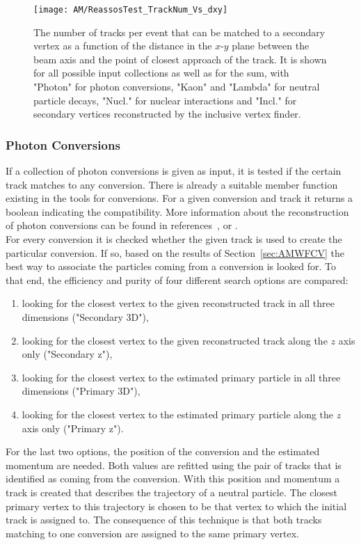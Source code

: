 \begin{figure}[Ht]
    \centering
    \texttt{[image: AM/ReassosTest\_TrackNum\_Vs\_dxy]}
    \caption[Number of tracks that can be matched to a secondary vertex]{The number of tracks per event that can be matched to a secondary vertex as a function of the distance in the $x$-$y$ plane between the beam axis and the point of closest approach of the track. It is shown for all possible input collections as well as for the sum, with "Photon" for photon conversions, "Kaon" and "Lambda" for neutral particle decays, "Nucl." for nuclear interactions and "Incl." for secondary vertices reconstructed by the inclusive vertex finder.\label{plot:AMWFSVfrac}}
\end{figure}

\subsubsection{Photon Conversions \label{sec:AMWFSVpc}}
If a collection of photon conversions is given as input, it is tested if the certain track matches to any conversion. There is already a suitable member function existing in the tools for conversions. For a given conversion and track it returns a boolean indicating the compatibility. More information about the reconstruction of photon conversions can be found in references~,  or . \\
For every conversion it is checked whether the given track is used to create the particular conversion. If so, based on the results of Section~\ref{sec:AMWFCV} the best way to associate the particles coming from a conversion is looked for. To that end, the efficiency and purity of four different search options are compared:
\begin{enumerate}
    \item looking for the closest vertex to the given reconstructed track in all three dimensions ("Secondary 3D"),
    \item looking for the closest vertex to the given reconstructed track along the $z$ axis only ("Secondary z"),
    \item looking for the closest vertex to the estimated primary particle in all three dimensions ("Primary 3D"),
    \item looking for the closest vertex to the estimated primary particle along the $z$ axis only ("Primary z").
\end{enumerate}
For the last two options, the position of the conversion and the estimated momentum are needed. Both values are refitted using the pair of tracks that is identified as coming from the conversion. With this position and momentum a track is created that describes the trajectory of a neutral particle. The closest primary vertex to this trajectory is chosen to be that vertex to which the initial track is assigned to. The consequence of this technique is that both tracks matching to one conversion are assigned to the same primary vertex. \\
